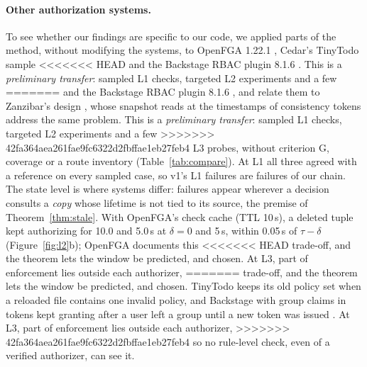 \documentclass[sigconf,review,anonymous]{acmart}
\begin{document}
\paragraph{Other authorization systems.} To see whether our findings are specific to our code, we applied parts of
the method, without modifying the systems, to OpenFGA 1.22.1 \cite{openfga}, Cedar's TinyTodo sample
<<<<<<< HEAD
\cite{cedarexamples} and the Backstage RBAC plugin 8.1.6 \cite{backstagerbac}. This is a \emph{preliminary transfer}: sampled L1 checks, targeted L2 experiments and a few
=======
\cite{cedarexamples} and the Backstage RBAC plugin 8.1.6 \cite{backstagerbac}, and relate them to Zanzibar's design
\cite{pang2019zanzibar}, whose snapshot reads at the timestamps of consistency tokens address the same problem. This is a \emph{preliminary transfer}: sampled L1 checks, targeted L2 experiments and a few
>>>>>>> 42fa364aea261fae9fc6322d2fbffae1eb27feb4
L3 probes, without criterion G, coverage or a route inventory (Table~\ref{tab:compare}). At L1 all three agreed
with a reference on every sampled case, so v1's L1 failures are failures of our chain. The state level is where
systems differ: failures appear wherever a decision consults a \emph{copy} whose lifetime is not tied to its source,
the premise of Theorem~\ref{thm:stale}. With OpenFGA's check cache (TTL 10\,s), a deleted tuple kept authorizing for
10.0 and 5.0\,s at $\delta=0$ and 5\,s, within 0.05\,s of $\tau-\delta$ (Figure~\ref{fig:l2}b); OpenFGA documents this
<<<<<<< HEAD
trade-off, and the theorem lets the window be predicted, and chosen. At L3, part of enforcement lies outside each authorizer,
=======
trade-off, and the theorem lets the window be predicted, and chosen. TinyTodo keeps its old policy set when a
reloaded file contains one invalid policy, and Backstage with group claims in tokens kept granting after a user left
a group until a new token was issued \cite{backstageauth}. At L3, part of enforcement lies outside each authorizer,
>>>>>>> 42fa364aea261fae9fc6322d2fbffae1eb27feb4
so no rule-level check, even of a verified authorizer, can see it.
\end{document}
